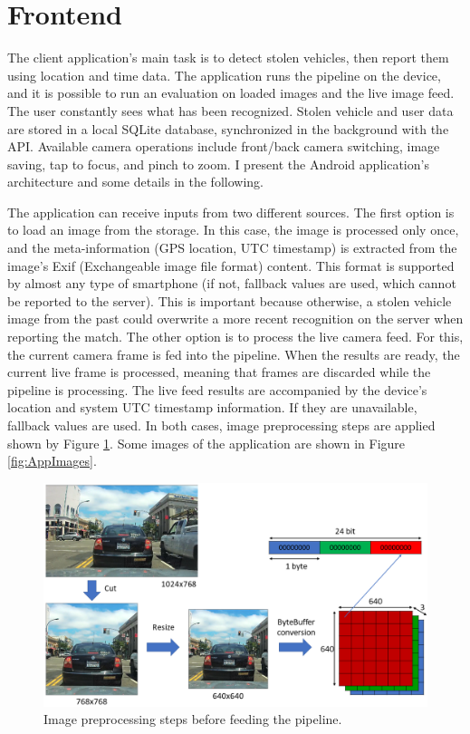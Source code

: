 \section{Frontend}

The client application's main task is to detect stolen vehicles, then report them using location and time data. The application runs the pipeline on the device, and it is possible to run an evaluation on loaded images and the live image feed. The user constantly sees what has been recognized. Stolen vehicle and user data are stored in a local SQLite database, synchronized in the background with the API. Available camera operations include front/back camera switching, image saving, tap to focus, and pinch to zoom. I present the Android application's architecture and some details in the following.

The application can receive inputs from two different sources. The first option is to load an image from the storage. In this case, the image is processed only once, and the meta-information (GPS location, UTC timestamp) is extracted from the image's Exif (Exchangeable image file format) content. This format is supported by almost any type of smartphone (if not, fallback values are used, which cannot be reported to the server). This is important because otherwise, a stolen vehicle image from the past could overwrite a more recent recognition on the server when reporting the match. The other option is to process the live camera feed. For this, the current camera frame is fed into the pipeline. When the results are ready, the current live frame is processed, meaning that frames are discarded while the pipeline is processing. The live feed results are accompanied by the device's location and system UTC timestamp information. If they are unavailable, fallback values are used. In both cases, image preprocessing steps are applied shown by Figure \ref{fig:image_preprocessing}. Some images of the application are shown in Figure \ref{fig:AppImages}.

\begin{figure}[htb]
 \centerline{\includegraphics[width=0.9\columnwidth]{.//Figure/System/image_preprocessing.png}}
 \caption{Image preprocessing steps before feeding the pipeline.}
 \label{fig:image_preprocessing}
\end{figure}

